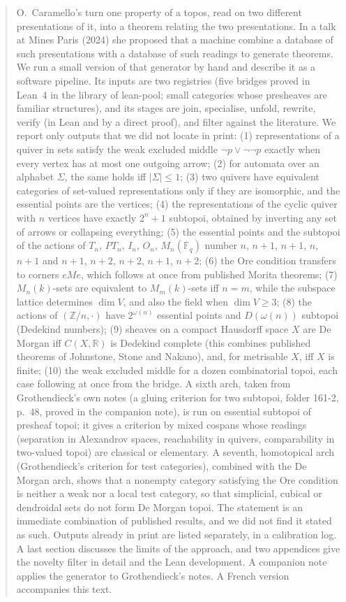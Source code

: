 \begin{abstract}
O.~Caramello's  turn one property of a topos, read on two different presentations of it, into a theorem relating the two presentations. In a talk at Mines Paris (2024) she proposed that a machine combine a database of such presentations with a database of such readings to generate theorems. We run a small version of that generator by hand and describe it as a software pipeline. Its inputs are two registries (five bridges proved in Lean~4 in the library \lp{} of lean-pool; small categories whose presheaves are familiar structures), and its stages are join, specialise, unfold, rewrite, verify (in Lean and by a direct proof), and filter against the literature. We report only outputs that we did not locate in print: (1) representations of a quiver in sets satisfy the weak excluded middle $\neg p\vee\neg\neg p$ exactly when every vertex has at most one outgoing arrow; (2) for automata over an alphabet $\Sigma$, the same holds iff $|\Sigma|\le 1$; (3) two quivers have equivalent categories of set-valued representations only if they are isomorphic, and the essential points are the vertices; (4) the representations of the cyclic quiver with $n$ vertices have exactly $2^n+1$ subtopoi, obtained by inverting any set of arrows or collapsing everything; (5) the essential points and the subtopoi of the actions of $T_n$, $PT_n$, $I_n$, $O_n$, $M_n(\mathbb F_q)$ number $n$, $n+1$, $n+1$, $n$, $n+1$ and $n+1$, $n+2$, $n+2$, $n+1$, $n+2$; (6) the Ore condition transfers to corners $eMe$, which follows at once from published Morita theorems; (7) $M_n(k)$-sets are equivalent to $M_m(k)$-sets iff $n=m$, while the subspace lattice determines $\dim V$, and also the field when $\dim V\ge 3$; (8) the actions of $(\mathbb Z/n,\cdot)$ have $2^{\omega(n)}$ essential points and $D(\omega(n))$ subtopoi (Dedekind numbers); (9) sheaves on a compact Hausdorff space $X$ are De Morgan iff $C(X,\mathbb R)$ is Dedekind complete (this combines published theorems of Johnstone, Stone and Nakano), and, for metrisable $X$, iff $X$ is finite; (10) the weak excluded middle for a dozen combinatorial topoi, each case following at once from the bridge. A sixth arch, taken from Grothendieck's own notes (a gluing criterion for two subtopoi, folder 161-2, p.~48, proved in the companion note), is run on essential subtopoi of presheaf topoi; it gives a criterion by mixed cospans whose readings (separation in Alexandrov spaces, reachability in quivers, comparability in two-valued topoi) are classical or elementary. A seventh, homotopical arch (Grothendieck's criterion for test categories), combined with the De Morgan arch, shows that a nonempty category satisfying the Ore condition is neither a weak nor a local test category, so that simplicial, cubical or dendroidal sets do not form De Morgan topoi. The statement is an immediate combination of published results, and we did not find it stated as such. Outputs already in print are listed separately, in a calibration log. A last section discusses the limits of the approach, and two appendices give the novelty filter in detail and the Lean development. A companion note applies the generator to Grothendieck's notes. A French version accompanies this text.
\end{abstract}
